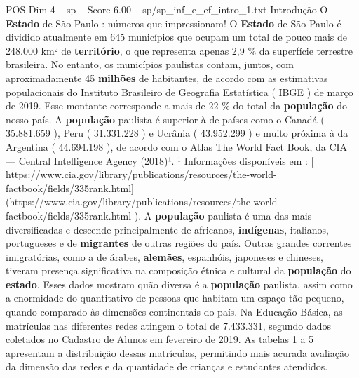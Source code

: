 \begin{textsample}{POS Dim 4 – sp – Score 6.00 – sp/sp\_inf\_e\_ef\_intro\_1.txt}  \label{ex:f4_pos_256}
Introdução O \textbf{Estado} de São Paulo : números que impressionam!
O \textbf{Estado} de São Paulo é dividido atualmente em 645 municípios que ocupam um total de pouco mais de 248.000 km² de \textbf{território}, o que representa apenas 2,9 \% da superfície terrestre brasileira.
No entanto, os municípios paulistas contam, juntos, com aproximadamente 45 \textbf{milhões} de habitantes, de acordo com as estimativas populacionais do Instituto Brasileiro de Geografia Estatística ( IBGE ) de março de 2019.
Esse montante corresponde a mais de 22 \% do total da \textbf{população} do nosso país.
A \textbf{população} paulista é superior à de países como o Canadá ( 35.881.659 ), Peru ( 31.331.228 ) e Ucrânia ( 43.952.299 ) e muito próxima à da Argentina ( 44.694.198 ), de acordo com o Atlas The World Fact Book, da CIA — Central Intelligence Agency (2018)¹. ¹ Informações disponíveis em : [ https://www.cia.gov/library/publications/resources/the-world-factbook/fields/335rank.html](https://www.cia.gov/library/publications/resources/the-world-factbook/fields/335rank.html ).
A \textbf{população} paulista é uma das mais diversificadas e descende principalmente de africanos, \textbf{indígenas}, italianos, portugueses e de \textbf{migrantes} de outras regiões do país.
Outras grandes correntes imigratórias, como a de árabes, \textbf{alemães}, espanhóis, japoneses e chineses, tiveram presença significativa na composição étnica e cultural da \textbf{população} do \textbf{estado}.
Esses dados mostram quão diversa é a \textbf{população} paulista, assim como a enormidade do quantitativo de pessoas que habitam um espaço tão pequeno, quando comparado às dimensões continentais do país.
Na Educação Básica, as matrículas nas diferentes redes atingem o total de 7.433.331, segundo dados coletados no Cadastro de Alunos em fevereiro de 2019.
As tabelas 1 a 5 apresentam a distribuição dessas matrículas, permitindo mais acurada avaliação da dimensão das redes e da quantidade de crianças e estudantes atendidos.

\end{textsample}
